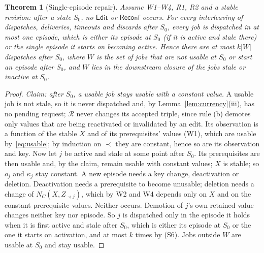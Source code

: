\documentclass[pdflatex,sn-mathphys-num]{sn-jnl}
\theoremstyle{thmstyleone}%
\newtheorem{theorem}{Theorem}%
\theoremstyle{thmstyletwo}%
\theoremstyle{thmstylethree}%
\newcommand{\key}{\kappa}
\begin{document}
\begin{theorem}[Single-episode repair]\label{thm:single}
Assume W1--W4, R1, R2 and a stable revision: after a state $S_0$, no $\mathsf{Edit}$ or $\mathsf{Reconf}$ occurs. For every interleaving of dispatches, deliveries, timeouts and discards after $S_0$, every job is dispatched in at most one episode, which is either its episode at $S_0$ (if it is active and stale there) or the single episode it starts on becoming active. Hence there are at most $k|W|$ dispatches after $S_0$, where $W$ is the set of jobs that are not usable at $S_0$ or start an episode after $S_0$, and $W$ lies in the downstream closure of the jobs stale or inactive at $S_0$.
\end{theorem}
\begin{proof}
\emph{Claim: after $S_0$, a usable job stays usable with a constant value.} A usable job is not stale, so it is never dispatched and, by Lemma~\ref{lem:currency}(iii), has no pending request; $\mathcal R$ never changes its accepted triple, since rule (b) demotes only values that are being reactivated or invalidated by an edit. Its observation is a function of the stable $X$ and of its prerequisites' values (W1), which are usable by~\eqref{eq:usable}; by induction on $\prec$ they are constant, hence so are its observation and key.
Now let $j$ be active and stale at some point after $S_0$. Its prerequisites are then usable and, by the claim, remain usable with constant values; $X$ is stable; so $o_j$ and $\key_j$ stay constant. A new episode needs a key change, deactivation or deletion. Deactivation needs a prerequisite to become unusable; deletion needs a change of $N_C(X,Z_{\prec j})$, which by W2 and W4 depends only on $X$ and on the constant prerequisite values. Neither occurs. Demotion of $j$'s own retained value changes neither key nor episode. So $j$ is dispatched only in the episode it holds when it is first active and stale after $S_0$, which is either its episode at $S_0$ or the one it starts on activation, and at most $k$ times by (S6). Jobs outside $W$ are usable at $S_0$ and stay usable.
\end{proof}
\end{document}
